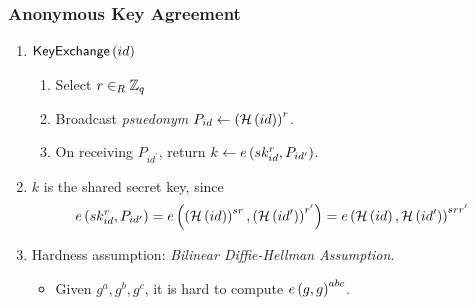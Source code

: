 \documentclass{beamer}
\begin{document}
    \begin{frame}
        \frametitle{Anonymous Key Agreement}
        \begin{enumerate}
            \item<1-> \(\mathsf{KeyExchange}\left(id\right)\)
            \begin{enumerate}
                \item Select \(r \in_R \mathbb Z_q\)
                \item Broadcast \emph{psuedonym} \(P_{id} \gets
                \left(\mathcal H\left(id\right)\right)^r\).
                \item On receiving \(P_{id^{\prime}}\), return \(k \gets
                e\left(sk_{id}^r, P_{id^{\prime}}\right)\).
            \end{enumerate}
            \item<2-> \(k\) is the shared secret key, since
            \begin{equation}
                e\left(sk_{id}^r, P_{id^{\prime}}\right) = e\left(\left(\mathcal H\left(id\right)\right)^{sr}, \left(\mathcal H\left(id^{\prime}\right)\right)^{r^{\prime}}\right) = e\left(\mathcal H\left(id\right), \mathcal H\left(id^{\prime}\right)\right)^{srr^{\prime}}
                \label{eq:aka-correctness}
            \end{equation}
            \item<3-> Hardness assumption: \emph{Bilinear Diffie-Hellman
            Assumption}.
            \begin{itemize}
                \item Given \(g^a, g^b, g^c\), it is hard to compute \(e\left(g,
                g\right)^{abc}\).
            \end{itemize}
        \end{enumerate}
    \end{frame}
\end{document}
